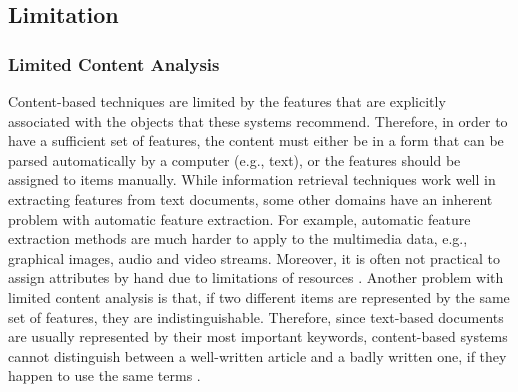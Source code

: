 \subsection{Limitation}
\subsubsection{Limited Content Analysis}
Content-based techniques are limited by the features that are explicitly associated with the objects that these systems recommend. Therefore, in order to have a sufficient set of features, the content must either be in a form that can be parsed automatically by a computer (e.g., text), or the features should be assigned to items manually. While information retrieval techniques work well in extracting features from text documents, some other domains have an inherent problem with automatic feature extraction. For example, automatic feature extraction methods are much harder to apply to the multimedia data, e.g., graphical images, audio and video streams. Moreover, it is often not practical to assign attributes by hand due to limitations of resources \citep{recom_97}.
Another problem with limited content analysis is that, if two different items are represented by the same set of features, they are indistinguishable. Therefore, since text-based documents are usually represented by their most important keywords, content-based systems cannot distinguish between a well-written article and a badly written one, if they happen to use the same terms \citep{recom_97}.

